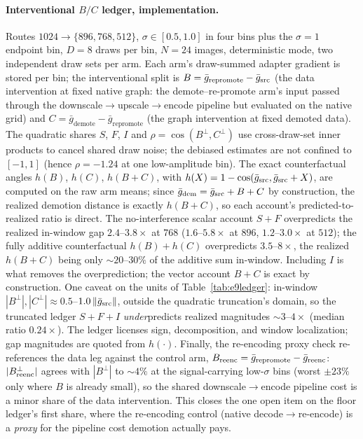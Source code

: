 \paragraph{Interventional $B/C$ ledger, implementation.} Routes
$1024{\to}\{896, 768, 512\}$, $\sigma \in [0.5, 1.0]$ in four bins plus
the $\sigma{=}1$ endpoint bin, $D{=}8$ draws per bin, $N{=}24$ images,
deterministic mode, two independent draw sets per arm. Each arm's
draw-summed adapter gradient is stored per bin; the interventional split
is $B = \bar g_{\mathrm{repromote}} - \bar g_{\mathrm{src}}$ (the data
intervention at fixed native graph: the demote--re-promote arm's input
passed through the downscale$\to$upscale$\to$encode pipeline but
evaluated on the native grid) and
$C = \bar g_{\mathrm{demote}} - \bar g_{\mathrm{repromote}}$ (the graph
intervention at fixed demoted data). The quadratic shares $S$, $F$, $I$
and $\rho = \cos(B^{\perp}, C^{\perp})$ use cross-draw-set inner
products to cancel shared draw noise; the debiased estimates are not
confined to $[-1, 1]$ (hence $\rho = -1.24$ at one low-amplitude
bin).
The exact counterfactual angles $h(B)$, $h(C)$, $h(B{+}C)$, with
$h(X) = 1 - \cos(\bar g_{\mathrm{src}}, \bar g_{\mathrm{src}} + X)$, are computed on
the raw arm means; since $\bar g_{\mathrm{dem}} = \bar g_{\mathrm{src}} + B + C$ by
construction, the realized demotion distance is exactly $h(B{+}C)$, so
each account's predicted-to-realized ratio is direct. The
no-interference scalar account $S{+}F$ overpredicts the realized
in-window gap $2.4$--$3.8\times$ at $768$ ($1.6$--$5.8\times$ at $896$,
$1.2$--$3.0\times$ at $512$); the fully additive counterfactual
$h(B) + h(C)$ overpredicts $3.5$--$8\times$, the realized $h(B{+}C)$
being only ${\sim}20$--$30\%$ of the additive sum in-window. Including
$I$ is what removes the overprediction; the vector account $B{+}C$ is
exact by construction. One caveat on the units of
Table~\ref{tab:e9ledger}: in-window
$|B^{\perp}|, |C^{\perp}| \approx 0.5$--$1.0\,\|\bar g_{\mathrm{src}}\|$,
outside the quadratic truncation's domain, so the truncated ledger
$S{+}F{+}I$ \emph{under}predicts realized magnitudes ${\sim}3$--$4\times$
(median ratio $0.24\times$). The ledger licenses sign, decomposition,
and window localization; gap magnitudes are quoted from $h(\cdot)$.
Finally, the re-encoding proxy check re-references the data leg against
the control arm, $B_{\mathrm{reenc}} = \bar g_{\mathrm{repromote}} -
\bar g_{\mathrm{reenc}}$: $|B^{\perp}_{\mathrm{reenc}}|$ agrees with $|B^{\perp}|$ to
${\sim}4\%$ at the signal-carrying low-$\sigma$ bins (worst $\pm 23\%$
only where $B$ is already small), so the shared downscale$\to$encode
pipeline cost is a minor share of the data intervention. This closes
the one open item on the floor ledger's first share, where the
re-encoding control (native decode$\to$re-encode) is a \emph{proxy}
for the pipeline cost demotion actually pays.

